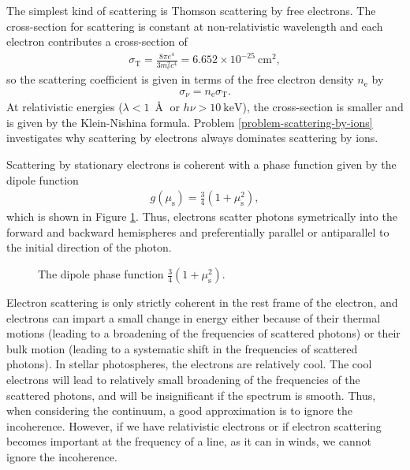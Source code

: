 The simplest kind of scattering is Thomson scattering by
free electrons. The cross-section for scattering is constant
at non-relativistic wavelength and each electron contributes
a cross-section of
\begin{align}
\sigma_\mathrm{T} = 
\frac{8 \pi e^4}{3 m_\mathrm{e}^2 c^4} = 6.652 \times
10^{-25}\:\mathrm{cm^2},
\end{align}
so the scattering coefficient is given in terms of the free
electron density $n_\mathrm{e}$ by
\begin{align}
\sigma_\nu = n_\mathrm{e} \sigma_\mathrm{T}.
\end{align}
At relativistic energies ($\lambda < 1\:\Angstrom$ or $h\nu
> 10\:\mathrm{keV}$), the cross-section is smaller and is
given by the Klein-Nishina formula. Problem
\ref{problem-scattering-by-ions} investigates why scattering by
electrons always dominates scattering by ions.

Scattering by stationary electrons is coherent with a phase
function given by the dipole function
\begin{align}
g(\mu_\mathrm{s}) = \frac{3}{4} (1 + \mu_\mathrm{s}^2),
\end{align}
which is shown in Figure \ref{figure-dipole}. Thus,
electrons scatter photons symetrically into the forward and
backward hemispheres and preferentially parallel or
antiparallel to the initial direction of the photon.

\begin{figure}
\caption{The dipole phase function $\frac{3}{4} (1 +
\mu_\mathrm{s}^2)$.}
\label{figure-dipole}
\end{figure}

Electron scattering is only strictly coherent in the rest
frame of the electron, and electrons can impart a small
change in energy either because of their thermal motions
(leading to a broadening of the frequencies of scattered
photons) or their bulk motion (leading to a systematic shift
in the frequencies of scattered photons). In stellar
photospheres, the electrons are relatively cool. The cool
electrons will lead to relatively small broadening of the
frequencies of the scattered photons, and will be
insignificant if the spectrum is smooth. Thus, when
considering the continuum, a good approximation is to ignore
the incoherence. However, if we have relativistic electrons
or if electron scattering becomes important at the frequency
of a line, as it can in winds, we cannot ignore the
incoherence.


